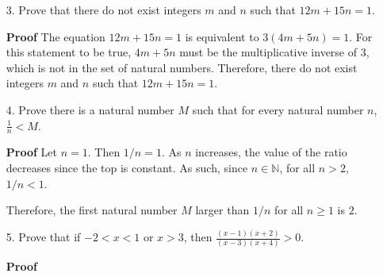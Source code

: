 \documentclass[12pt]{article}
\begin{document}
\begin{enumerate}
\item[3.] Prove that there do not exist integers $m$ and $n$ such that $12m + 15n = 1$.
\end{enumerate}

\begin{enumerate}
  \item[\textbf{Proof}] The equation $12m + 15n = 1$ is equivalent to $3(4m+5n)=1$. For this statement to be true, $4m+5n$ must be the multiplicative inverse of $3$, which is not in the set of natural numbers. Therefore, there do not exist integers $m$ and $n$ such that $12m + 15n = 1$.
\end{enumerate}

\begin{enumerate}
\item[4.] Prove there is a natural number $M$ such that for every natural number $n$, $\frac{1}{n} < M$.
\end{enumerate}

\begin{enumerate}
  \item[\textbf{Proof}] Let $n=1$. Then $1/n=1$. As $n$ increases, the value of the ratio decreases since the top is constant. As such, since $n\in\mathbb{N}$, for all $n>2$, $1/n < 1$.
  \item[] Therefore, the first natural number $M$ larger than $1/n$ for all $n\geq 1$ is $2$.
\end{enumerate}

\begin{enumerate}
\item[5.] Prove that if $-2 < x < 1$ or $x > 3$, then $\frac{(x-1)(x+2)}{(x-3)(x+4)} > 0$.
\end{enumerate}

\begin{enumerate}
  \item[\textbf{Proof}]
\end{enumerate}
\end{document}
